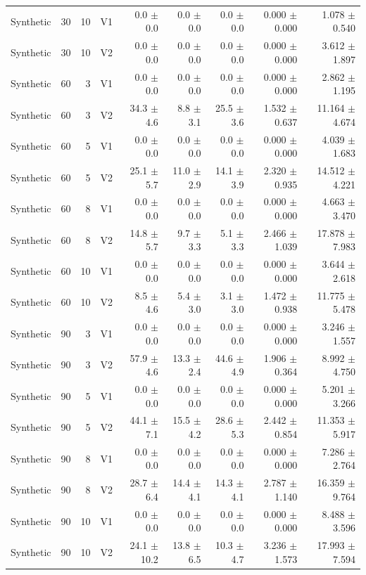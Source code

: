 \documentclass[10pt,a4paper]{article}
\begin{document}
\begin{landscape}
\begin{longtable}{@{}lrrlrrrrr@{}}
Synthetic & 30 & 10 & V1 & 0.0 $\pm$ 0.0 & 0.0 $\pm$ 0.0 & 0.0 $\pm$ 0.0 & 0.000 $\pm$ 0.000 & 1.078 $\pm$ 0.540 \\
Synthetic & 30 & 10 & V2 & 0.0 $\pm$ 0.0 & 0.0 $\pm$ 0.0 & 0.0 $\pm$ 0.0 & 0.000 $\pm$ 0.000 & 3.612 $\pm$ 1.897 \\
Synthetic & 60 & 3 & V1 & 0.0 $\pm$ 0.0 & 0.0 $\pm$ 0.0 & 0.0 $\pm$ 0.0 & 0.000 $\pm$ 0.000 & 2.862 $\pm$ 1.195 \\
Synthetic & 60 & 3 & V2 & 34.3 $\pm$ 4.6 & 8.8 $\pm$ 3.1 & 25.5 $\pm$ 3.6 & 1.532 $\pm$ 0.637 & 11.164 $\pm$ 4.674 \\
Synthetic & 60 & 5 & V1 & 0.0 $\pm$ 0.0 & 0.0 $\pm$ 0.0 & 0.0 $\pm$ 0.0 & 0.000 $\pm$ 0.000 & 4.039 $\pm$ 1.683 \\
Synthetic & 60 & 5 & V2 & 25.1 $\pm$ 5.7 & 11.0 $\pm$ 2.9 & 14.1 $\pm$ 3.9 & 2.320 $\pm$ 0.935 & 14.512 $\pm$ 4.221 \\
Synthetic & 60 & 8 & V1 & 0.0 $\pm$ 0.0 & 0.0 $\pm$ 0.0 & 0.0 $\pm$ 0.0 & 0.000 $\pm$ 0.000 & 4.663 $\pm$ 3.470 \\
Synthetic & 60 & 8 & V2 & 14.8 $\pm$ 5.7 & 9.7 $\pm$ 3.3 & 5.1 $\pm$ 3.3 & 2.466 $\pm$ 1.039 & 17.878 $\pm$ 7.983 \\
Synthetic & 60 & 10 & V1 & 0.0 $\pm$ 0.0 & 0.0 $\pm$ 0.0 & 0.0 $\pm$ 0.0 & 0.000 $\pm$ 0.000 & 3.644 $\pm$ 2.618 \\
Synthetic & 60 & 10 & V2 & 8.5 $\pm$ 4.6 & 5.4 $\pm$ 3.0 & 3.1 $\pm$ 3.0 & 1.472 $\pm$ 0.938 & 11.775 $\pm$ 5.478 \\
Synthetic & 90 & 3 & V1 & 0.0 $\pm$ 0.0 & 0.0 $\pm$ 0.0 & 0.0 $\pm$ 0.0 & 0.000 $\pm$ 0.000 & 3.246 $\pm$ 1.557 \\
Synthetic & 90 & 3 & V2 & 57.9 $\pm$ 4.6 & 13.3 $\pm$ 2.4 & 44.6 $\pm$ 4.9 & 1.906 $\pm$ 0.364 & 8.992 $\pm$ 4.750 \\
Synthetic & 90 & 5 & V1 & 0.0 $\pm$ 0.0 & 0.0 $\pm$ 0.0 & 0.0 $\pm$ 0.0 & 0.000 $\pm$ 0.000 & 5.201 $\pm$ 3.266 \\
Synthetic & 90 & 5 & V2 & 44.1 $\pm$ 7.1 & 15.5 $\pm$ 4.2 & 28.6 $\pm$ 5.3 & 2.442 $\pm$ 0.854 & 11.353 $\pm$ 5.917 \\
Synthetic & 90 & 8 & V1 & 0.0 $\pm$ 0.0 & 0.0 $\pm$ 0.0 & 0.0 $\pm$ 0.0 & 0.000 $\pm$ 0.000 & 7.286 $\pm$ 2.764 \\
Synthetic & 90 & 8 & V2 & 28.7 $\pm$ 6.4 & 14.4 $\pm$ 4.1 & 14.3 $\pm$ 4.1 & 2.787 $\pm$ 1.140 & 16.359 $\pm$ 9.764 \\
Synthetic & 90 & 10 & V1 & 0.0 $\pm$ 0.0 & 0.0 $\pm$ 0.0 & 0.0 $\pm$ 0.0 & 0.000 $\pm$ 0.000 & 8.488 $\pm$ 3.596 \\
Synthetic & 90 & 10 & V2 & 24.1 $\pm$ 10.2 & 13.8 $\pm$ 6.5 & 10.3 $\pm$ 4.7 & 3.236 $\pm$ 1.573 & 17.993 $\pm$ 7.594 \\
\bottomrule\end{longtable}\end{landscape}
\end{document}
